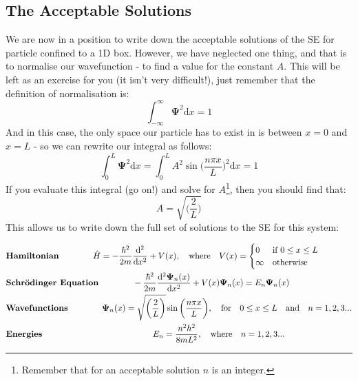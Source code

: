 \documentclass{memoir}[11pt,oneside,a4paper,openany]
\newenvironment{myblock}[1]{%
    \tcolorbox[beamer,%
    noparskip,breakable,
    colback=LightBlue,colframe=DarkBlue,%
    colbacklower=DarkBlue!75!LightBlue,%
    title=#1]}%
    {\endtcolorbox}
\newcommand{\wf}{\ensuremath{\bm{\Psi}}\xspace}
\newcommand{\dd}{\ensuremath{\mathrm{d}}}
\begin{document}
\subsection{The Acceptable Solutions}
We are now in a position to write down the acceptable solutions of the SE for particle confined to a 1D box. However, we have neglected one thing, and that is to normalise our wavefunction - to find a value for the constant $A$. This will be left as an exercise for you (it isn't very difficult!), just remember that the definition of normalisation is:
\begin{equation}
	\int_{-\infty}^\infty \wf^2 \dd x = 1
\end{equation}
And in this case, the only space our particle has to exist in is between $x=0$ and $x=L$ - so we can rewrite our integral as follows:
\begin{equation}
	\int_0^L \wf^2 \dd x = \int_0^L A^2 \sin\bigg(\frac{n\pi x}{L}\bigg)^2 \dd x = 1
\end{equation}
If you evaluate this integral (go on!) and solve for $A$\footnote{Remember that for an acceptable solution $n$ is an integer.}, then you should find that:
\begin{equation}
	A = \sqrt{\bigg(\frac{2}{L}\bigg)}
\end{equation}
This allows us to write down the full set of solutions to the SE for this system:
\begin{myblock}{\begin{center}Particle in a 1D Box\end{center}}
	\begin{center}
		\begin{align*} & \text{\textbf{Hamiltonian}} \qquad\qquad \hat{H} = -\frac{\hbar^2}{2m}\frac{\dd^2}{\dd x^2} + V(x),\quad  \text{where} \quad V(x) = \begin{cases} 0 &\mbox{if}~ 0\leq x \leq L \\ \infty & \mbox{otherwise} \end{cases} \\
	& \text{\textbf{Schr{\"o}dinger Equation}} \qquad\qquad -\frac{\hbar^2}{2m}\frac{\dd^2\wf_n(x)}{\dd x^2} + V(x)\wf_n(x) = E_n \wf_n(x) \\
		& \text{\textbf{Wavefunctions}} \qquad\qquad \wf_n(x) = \sqrt{\bigg(\frac{2}{L}\bigg)}\sin\bigg(\frac{n\pi x}{L}\bigg), \quad \text{for} \quad 0 \leq x \leq L \quad\text{and}\quad n = 1,2,3... \\ 
		& \text{\textbf{Energies}} \qquad\qquad\qquad\qquad\qquad\qquad\quad E_n = \frac{n^2h^2}{8mL^2}, \quad \text{where} \quad n = 1,2,3...
	\end{align*}
	\end{center}
\end{myblock}
\end{document}
